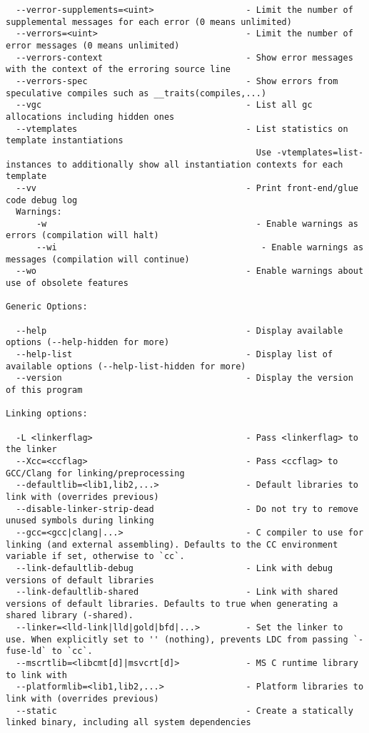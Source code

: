 \documentclass{studrep}
\begin{document}
\begin{verbatim}
  --verror-supplements=<uint>                  - Limit the number of supplemental messages for each error (0 means unlimited)
  --verrors=<uint>                             - Limit the number of error messages (0 means unlimited)
  --verrors-context                            - Show error messages with the context of the erroring source line
  --verrors-spec                               - Show errors from speculative compiles such as __traits(compiles,...)
  --vgc                                        - List all gc allocations including hidden ones
  --vtemplates                                 - List statistics on template instantiations
                                                 Use -vtemplates=list-instances to additionally show all instantiation contexts for each template
  --vv                                         - Print front-end/glue code debug log
  Warnings:
      -w                                         - Enable warnings as errors (compilation will halt)
      --wi                                        - Enable warnings as messages (compilation will continue)
  --wo                                         - Enable warnings about use of obsolete features

Generic Options:

  --help                                       - Display available options (--help-hidden for more)
  --help-list                                  - Display list of available options (--help-list-hidden for more)
  --version                                    - Display the version of this program

Linking options:

  -L <linkerflag>                              - Pass <linkerflag> to the linker
  --Xcc=<ccflag>                               - Pass <ccflag> to GCC/Clang for linking/preprocessing
  --defaultlib=<lib1,lib2,...>                 - Default libraries to link with (overrides previous)
  --disable-linker-strip-dead                  - Do not try to remove unused symbols during linking
  --gcc=<gcc|clang|...>                        - C compiler to use for linking (and external assembling). Defaults to the CC environment variable if set, otherwise to `cc`.
  --link-defaultlib-debug                      - Link with debug versions of default libraries
  --link-defaultlib-shared                     - Link with shared versions of default libraries. Defaults to true when generating a shared library (-shared).
  --linker=<lld-link|lld|gold|bfd|...>         - Set the linker to use. When explicitly set to '' (nothing), prevents LDC from passing `-fuse-ld` to `cc`.
  --mscrtlib=<libcmt[d]|msvcrt[d]>             - MS C runtime library to link with
  --platformlib=<lib1,lib2,...>                - Platform libraries to link with (overrides previous)
  --static                                     - Create a statically linked binary, including all system dependencies


\end{verbatim}
\end{document}
